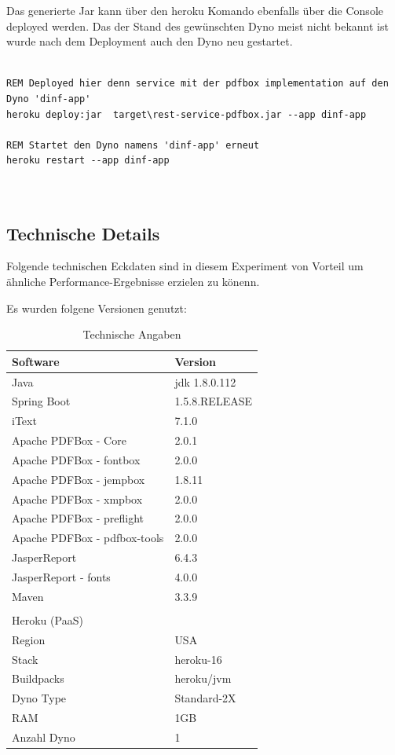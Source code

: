\documentclass[main.tex]{subfiles}
\begin{document}
Das generierte Jar kann über den heroku Komando ebenfalls über die Console deployed werden. Das der Stand des gewünschten Dyno meist nicht bekannt ist wurde nach dem Deployment auch den Dyno neu gestartet. 

\begin{lstlisting}[language=command.com]

REM Deployed hier denn service mit der pdfbox implementation auf den Dyno 'dinf-app'
heroku deploy:jar  target\rest-service-pdfbox.jar --app dinf-app

REM Startet den Dyno namens 'dinf-app' erneut
heroku restart --app dinf-app



\end{lstlisting}

\subsection{Technische Details}

Folgende technischen Eckdaten sind in diesem Experiment  von Vorteil um ähnliche Performance-Ergebnisse erzielen zu könenn. 

Es wurden folgene Versionen genutzt: 


\begin{table}[!hb]
\label{softversion}
\begin{tabular}{ll}
Software          & Version   \\ \hline
Java        &      jdk 1.8.0.112      \\
Spring Boot &         1.5.8.RELEASE        \\

iText        &        7.1.0  \\
Apache PDFBox - Core &  2.0.1 \\
Apache PDFBox - fontbox & 2.0.0 \\
Apache PDFBox - jempbox & 1.8.11 \\
Apache PDFBox - xmpbox & 2.0.0 \\
Apache PDFBox - preflight & 2.0.0 \\
Apache PDFBox - pdfbox-tools & 2.0.0 \\
JasperReport & 6.4.3 \\
JasperReport - fonts & 4.0.0 \\
Maven   &  3.3.9 \\
 & \\

Heroku (PaaS)    & \\ \hline
Region & USA \\
Stack & heroku-16 \\
Buildpacks & heroku/jvm \\
Dyno Type & Standard-2X \\
RAM & 1GB \\
Anzahl Dyno & 1 \\


\end{tabular}
\caption{Technische Angaben}
\end{table}
\end{document}

